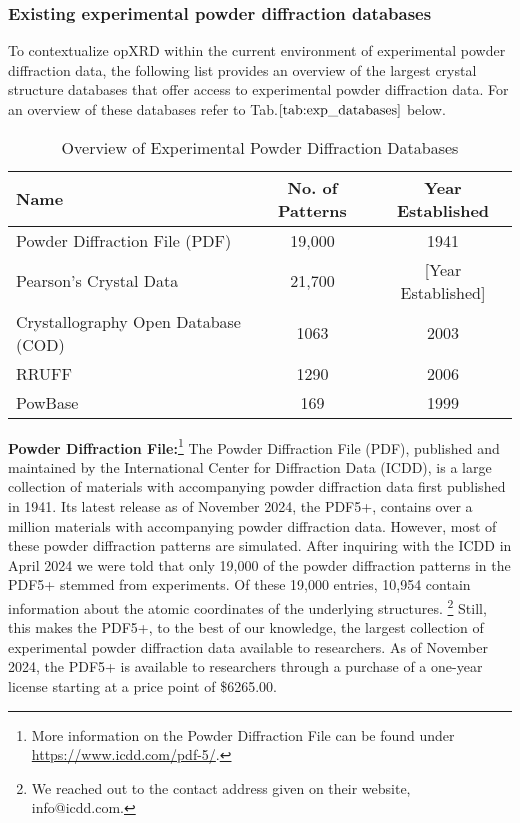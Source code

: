 \pagebreak

\subsubsection*{Existing experimental powder diffraction databases}
To contextualize opXRD within the current environment of experimental powder diffraction data, the following list provides an overview of the largest crystal structure databases that offer access to experimental powder diffraction data. For an overview of these databases refer to Tab.$\eqref{tab:exp_databases}$ below.\\

\begin{table}[!htb]
\centering
\caption{Overview of Experimental Powder Diffraction Databases}
\label{tab:exp_databases}
\begin{tabular}{@{}lcc@{}}
\toprule
\textbf{Name}                          & \textbf{No. of Patterns} & \textbf{Year Established} \\
\midrule
Powder Diffraction File (PDF)          & 19,000                  & 1941                      \\
Pearson's Crystal Data                 & 21,700                  & [Year Established]        \\
Crystallography Open Database (COD)    & 1063                    & 2003                      \\
RRUFF                                  & 1290                    & 2006                      \\
PowBase                                & 169                     & 1999                      \\
\bottomrule
\end{tabular}
\end{table}

\textbf{Powder Diffraction File:}\footnote{More information on the Powder Diffraction File can be found under \url{https://www.icdd.com/pdf-5/}.} The Powder Diffraction File (PDF), published and maintained by the International Center for Diffraction Data (ICDD), is a large collection of materials with accompanying powder diffraction data first published in 1941\cite{GatesRector2019}. Its latest release as of November 2024, the PDF5+, contains over a million materials with accompanying powder diffraction data. However, most of these powder diffraction patterns are simulated. After inquiring with the ICDD in April 2024 we were told that only 19,000 of the powder diffraction patterns in the PDF5+ stemmed from experiments. Of these 19,000 entries, 10,954 contain information about the atomic coordinates of the underlying structures. \footnote{We reached out to the contact address given on their website, info@icdd.com.} Still, this makes the PDF5+, to the best of our knowledge, the largest collection of experimental powder diffraction data available to researchers. As of November 2024, the PDF5+ is available to researchers through a purchase of a one-year license starting at a price point of \$6265.00.\\


